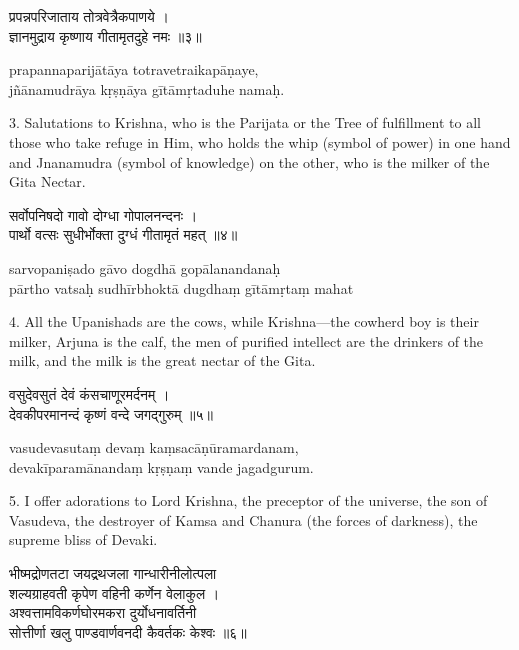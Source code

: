 \begin{gitaverse}
प्रपन्नपरिजाताय तोत्रवेत्रैकपाणये । \\
ज्ञानमुद्राय कृष्णाय गीतामृतदुहे नमः ॥३॥
\end{gitaverse}

\begin{transliteration}
prapannaparijātāya totravetraikapāṇaye, \\
jñānamudrāya kṛṣṇāya gītāmṛtaduhe namaḥ.
\end{transliteration}

3. Salutations to Krishna, who is the Parijata or the Tree of fulfillment to
all those who take refuge in Him, who holds the whip (symbol of power) in one
hand and Jnanamudra (symbol of knowledge) on the other, who is the milker of
the Gita Nectar.

\begin{gitaverse}
सर्वोपनिषदो गावो दोग्धा गोपालनन्दनः । \\
पार्थो वत्सः सुधीर्भोक्ता दुग्धं गीतामृतं महत् ॥४॥
\end{gitaverse}

\begin{transliteration}
sarvopaniṣado gāvo dogdhā gopālanandanaḥ \\
pārtho vatsaḥ sudhīrbhoktā dugdhaṃ gītāmṛtaṃ mahat
\end{transliteration}

4. All the Upanishads are the cows, while Krishna---the cowherd boy is their
milker, Arjuna is the calf, the men of purified intellect are the drinkers of
the milk, and the milk is the great nectar of the Gita.

\begin{gitaverse}
वसुदेवसुतं देवं कंसचाणूरमर्दनम् । \\
देवकीपरमानन्दं कृष्णं वन्दे जगद्गुरुम् ॥५॥
\end{gitaverse}

\begin{transliteration}
vasudevasutaṃ devaṃ kaṃsacāṇūramardanam, \\
devakīparamānandaṃ kṛṣṇaṃ vande jagadgurum.
\end{transliteration}

5. I offer adorations to Lord Krishna, the preceptor of the universe, the son
of Vasudeva, the destroyer of Kamsa and Chanura (the forces of darkness), the
supreme bliss of Devaki.

\begin{gitaverse}
भीष्मद्रोणतटा जयद्रथजला गान्धारीनीलोत्पला \\
\tab शल्यग्राहवती कृपेण वहिनी कर्णेन वेलाकुल । \\
अश्वत्तामविकर्णघोरमकरा दुर्योधनावर्तिनी \\
\tab सोत्तीर्णा खलु पाण्डवार्णवनदी कैवर्तकः केश्वः ॥६॥
\end{gitaverse}

